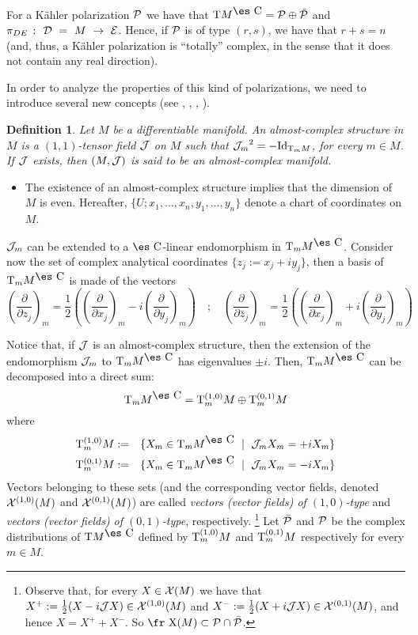 \documentclass[12pt]{article}
\theoremstyle{plain}
\newtheorem{definition}{Definition}
\def\beann{\begin{eqnarray*}}
\def\eeann{\end{eqnarray*}}
\def\derpar#1#2{\frac{\partial{#1}}{\partial{#2}}}
\def\vf{\mbox{\fr X}}
\def\P{{\cal P}}
\def\D{{\cal D}}
\def\E{{\cal E}}
\def\Complex{\mbox{\es C}}
\def\Tan{{\rm T}}
\begin{document}
For a K\"ahler polarization $\P$ we have that
$\Tan M^{\Complex} = \P \oplus \bar \P$
and $\pi_{DE}~\colon~\D~=~M~\to~\E$.
Hence, if $\P$ is of type $(r,s)$,
we have that $r+s=n$
(and, thus, a K\"ahler polarization is ``totally'' complex,
in the sense that it does not contain any real direction).

In order to analyze the properties of this kind of polarizations,
we need to introduce several new concepts
(see \cite{GS-77}, \cite{Ib-90}, \cite{Ok-87}, \cite{Wo-80}).

\begin{definition}
Let $M$ be a differentiable manifold.
An {\rm almost-complex structure} in $M$ is a $(1,1)$-tensor field
${\cal J}$ on $M$
such that ${{\cal J}_m}^2=-{\rm Id}_{\Tan_m M}$, for every $m \in M$.
If ${\cal J}$ exists, then $(M,{\cal J})$ is said to be an
{\rm almost-complex manifold}.
\end{definition}

\begin{itemize}
\item
The existence of an almost-complex structure
implies that the dimension of $M$ is even.
Hereafter, $\{ U; x_1,\ldots ,x_n,y_1,\ldots ,y_n\}$
denote a chart of coordinates on $M$.
\end{itemize}

${\cal J}_m$ can be extended to a $\Complex$-linear endomorphism
in $\Tan_m M^{\Complex}$.
Consider now the set of complex analytical coordinates
$\{ z_j := x_j+iy_j \}$,
then a basis of $\Tan_m M^{\Complex}$ is made of the vectors
$$
\left(\derpar{}{z_j}\right)_m = \frac{1}{2} \left(
\left(\derpar{}{x_j}\right)_m -i\left(\derpar{}{y_j}\right)_m \right)
\quad ; \quad
\left(\derpar{}{\bar z_j}\right)_m = \frac{1}{2} \left(
\left(\derpar{}{x_j}\right)_m +i\left(\derpar{}{y_j}\right)_m \right)
$$

Notice that, if ${\cal J}$ is an almost-complex structure, then
the extension of the endomorphism ${\cal J}_m$ to
$\Tan_mM^{\Complex}$ has eigenvalues $\pm i$. Then, $\Tan_m
M^{\Complex}$ can be decomposed into a direct sum: $$ \Tan_m
M^{\Complex} = \Tan_m^{(1,0)} M \oplus \Tan_m^{(0,1)} M $$ where
\beann \Tan_m^{(1,0)}M&:=&\{X_m \in \Tan_m M^{\Complex}\ \mid \
{\cal J}_m X_m=+iX_m\}
\\
\Tan_m^{(0,1)}M&:=&\{X_m \in \Tan_m M^{\Complex}\ \mid \ {\cal J}_m
X_m=-iX_m\}
\eeann
Vectors belonging to these sets
(and the corresponding vector fields,
denoted ${\cal X}^{(1,0)}(M)$ and
${\cal X}^{(0,1)}(M)$) are called
{\it vectors (vector fields) of $(1,0)$-type}
and
{\it vectors (vector fields) of $(0,1)$-type},
respectively.%
\footnote{
Observe that, for every $X \in {\cal X}(M)$
we have that
$X^+ := \frac{1}{2}(X-i{\cal J}X) \in {\cal X}^{(1,0)}(M)$
and
$X^- := \frac{1}{2}(X+i{\cal J}X) \in {\cal X}^{(0,1)}(M)$,
and hence $X = X^+ + X^-$. So $\vf (M)\subset \P \cap \bar\P$.}
Let $\bar \P$ and $\P$ be the complex distributions of
$\Tan M^{\Complex}$ defined by
$\Tan_m^{(1,0)}M$ and $\Tan_m^{(0,1)}M$
respectively for every $m \in M$.
\end{document}
